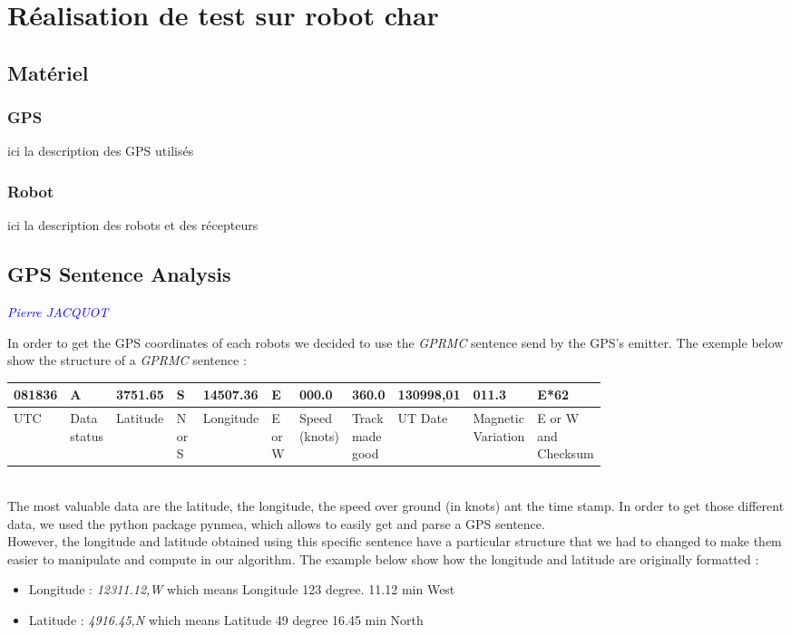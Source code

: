 \chapter{Réalisation de test sur robot char}
\section{Matériel}
\subsection{GPS}
ici la description des GPS utilisés
\subsection{Robot}
ici la description des robots et des récepteurs
\section{GPS Sentence Analysis}
\textcolor{blue}{\textit{Pierre JACQUOT}}

In order to get the GPS coordinates of each robots we decided to use the \textit{GPRMC} sentence send by the GPS's emitter. The exemple below show the structure of a \textit{GPRMC} sentence : \
\begin{center}
\begin{tabular}{|m{0.05\linewidth}|m{0.06\linewidth}|m{0.07\linewidth}|m{0.07\linewidth}|m{0.08\linewidth}|m{0.07\linewidth}|m{0.07\linewidth}|m{0.04\linewidth}|m{0.08\linewidth}|m{0.1\linewidth}|m{0.07\linewidth}|}
\hline
    081836 & A & 3751.65 & S & 14507.36 & E & 000.0 & 360.0 & 130998,01 & 011.3 & E*62  \\ \hline
     UTC & Data status & Latitude & N or S & Longitude & E or W & Speed (knots) & Track made good &  UT Date & Magnetic Variation & E or W and Checksum \\ \hline

\end{tabular}
\end{center}\\
The most valuable data are the latitude, the longitude, the speed over ground (in knots) ant the time stamp. In order to get those different data, we used the python package pynmea, which allows to easily get and parse a GPS sentence. \\
However, the longitude and latitude obtained using this specific sentence have a particular structure that we had to changed to make them easier to manipulate and compute in our algorithm. The example below show how the longitude and latitude are originally formatted :
\
\begin{itemize}
  \item Longitude  : \textit{12311.12,W} which means Longitude 123 degree. 11.12 min West
  \item Latitude : \textit{4916.45,N} which means Latitude 49 degree 16.45 min North
\end{itemize}

